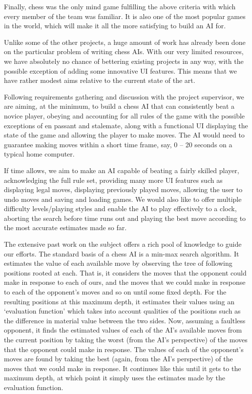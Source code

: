 \documentclass{l3proj}
\begin{document}
Finally, chess was the only mind game fulfilling the above criteria with which every
member of the team was familiar. It is also one of the most popular games in the world,
which will make it all the more satisfying to build an AI for.

Unlike some of the other projects, a huge amount of work has already been done on the
particular problem of writing chess AIs. With our very limited resources, we have
absolutely no chance of bettering existing projects in any way, with the possible exception
of adding some innovative UI features. This means that we have rather modest aims
relative to the current state of the art.

Following requirements gathering and discussion with the project supervisor, we are
aiming, at the minimum, to build a chess AI that can consistently beat a novice player,
obeying and accounting for all rules of the game with the possible exceptions of en
passant and stalemate, along with a functional UI displaying the state of the game and
allowing the player to make moves. The AI would need to guarantee making moves within
a short time frame, say, 0 – 20 seconds on a typical home computer.

If time allows, we aim to make an AI capable of beating a fairly skilled player,
acknowledging the full rule set, providing many more UI features such as displaying legal
moves, displaying previously played moves, allowing the user to undo moves and saving
and loading games. We would also like to offer multiple difficulty levels/playing styles and
enable the AI to play effectively to a clock, aborting the search before time runs out and
playing the best move according to the most accurate estimates made so far.

The extensive past work on the subject offers a rich pool of knowledge to guide our efforts.
The standard basis of a chess AI is a min-max search algorithm. It estimates the value of
each available move by observing the tree of following positions rooted at each. That is, it
considers the moves that the opponent could make in response to each of ours, and the
moves that we could make in response to each of the opponent’s moves and so on until
some fixed depth. For the resulting positions at this maximum depth, it estimates their
values using an ‘evaluation function’ which takes into account qualities of the positions
such as the difference in material value between the two sides. Now, assuming a faultless
opponent, it finds the estimated values of each of the AI’s available moves from the
current position by taking the worst (from the AI’s perspective) of the moves that the
opponent could make in response. The values of each of the opponent’s moves are found
by taking the best (again, from the AI’s perspective) of the moves that we could make in
response. It continues like this until it gets to the maximum depth, at which point it simply
uses the estimates made by the evaluation function.
\end{document}
